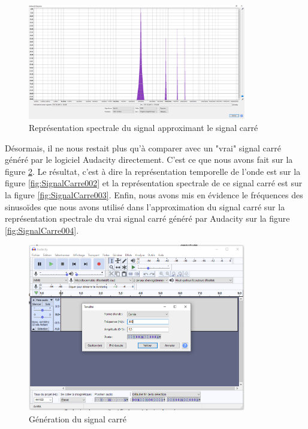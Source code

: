 \documentclass[a4paper]{article}
\begin{document}
\begin{figure}[H]
    \centering
    \includegraphics[width=0.85\textwidth]{images/SignalCarre020.PNG}
    \caption{Représentation spectrale du signal approximant le signal carré}
    \label{fig:SignalCarre020}
\end{figure}


Désormais, il ne nous restait plus qu'à comparer avec un "vrai" signal carré généré par le logiciel Audacity directement. C'est ce que nous avons fait sur la figure \ref{fig:SignalCarre001}. Le résultat, c'est à dire la représentation temporelle de l'onde est sur la figure \ref{fig:SignalCarre002} et la représentation spectrale de ce signal carré est sur la figure \ref{fig:SignalCarre003}. Enfin, nous avons mis en évidence le fréquences des sinusoïdes que nous avons utilisé dans l'approximation du signal carré sur la représentation spectrale du vrai signal carré généré par Audacity sur la figure \ref{fig:SignalCarre004}.


\begin{figure}[H]
    \centering
    \includegraphics[width=0.85\textwidth]{images/SignalCarre001.PNG}
    \caption{Génération du signal carré}
    \label{fig:SignalCarre001}
\end{figure}
\end{document}
